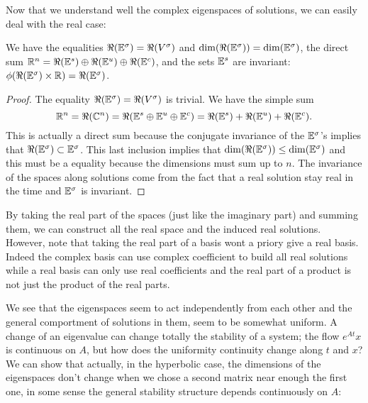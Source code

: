Now that we understand well the complex eigenspaces of solutions, we can easily deal with the real case:
\begin{corollaire}
    We have the equalities $\Re(\mathbb{E}^\sigma)=\Re(V^\sigma)$ and $\dim(\Re(\mathbb{E}^\sigma))=\dim(\mathbb{E}^\sigma)$, the direct sum
    $\mathbb{R}^n = \Re(\mathbb{E}^s)\oplus\Re(\mathbb{E}^u)\oplus\Re(\mathbb{E}^c)$, and the sets $\mathbb{E}^s$ are invariant:
    $\phi(\Re(\mathbb{E}^\sigma)\times\mathbb{R})=\Re(\mathbb{E}^\sigma)$.
\end{corollaire}
\begin{proof}
The equality $\Re(\mathbb{E}^\sigma)=\Re(V^\sigma)$ is trivial. We have the simple sum
$$\mathbb{R}^n 
=\Re(\mathbb{C}^n) 
=\Re(\mathbb{E}^s\oplus\mathbb{E}^u\oplus\mathbb{E}^c)
= \Re(\mathbb{E}^s)+\Re(\mathbb{E}^u)+\Re(\mathbb{E}^c).$$
This is actually a direct sum because the conjugate invariance of the $\mathbb{E}^\sigma$'s implies that $\Re(\mathbb{E}^\sigma)\subset\mathbb{E}^\sigma$. This last inclusion implies that $\dim(\Re(\mathbb{E}^\sigma))\leq\dim(\mathbb{E}^\sigma)$ and this must be a equality because the dimensions must sum up to $n$. The invariance of the spaces along solutions come from the fact that a real solution stay real in the time and $\mathbb{E}^\sigma$ is invariant.
\end{proof}
\begin{remarque}
By taking the real part of the spaces (just like the imaginary part) and summing them, we can construct all the real space and the induced real solutions. However, note that taking the real part of a basis wont a priory give a real basis. Indeed the complex basis can use complex coefficient to build all real solutions while a real basis can only use real coefficients and the real part of a product is not just the product of the real parts. 
\end{remarque}
We see that the eigenspaces seem to act independently from each other and the general comportment of solutions in them, seem to be somewhat uniform. A change of an eigenvalue can change totally the stability of a system; the flow $e^{At}x$ is continuous on $A$, but how does the uniformity continuity change along $t$ and $x$? We can show that actually, in the hyperbolic case, the dimensions of the eigenspaces don't change when we chose a second matrix near enough the first one, in some sense the general stability structure depends continuously on $A$:

